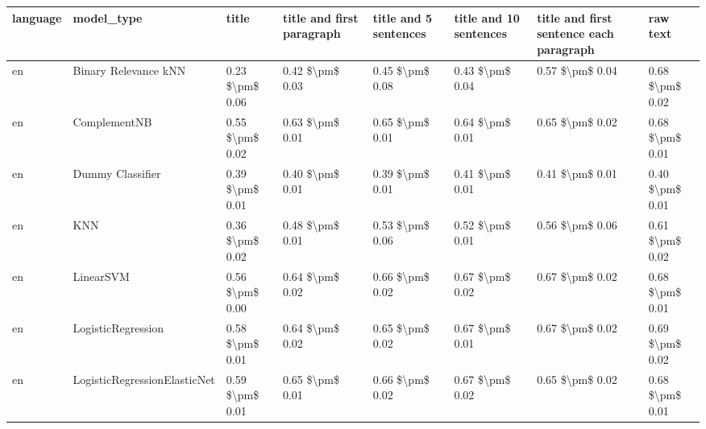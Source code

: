 \begin{tabular}{llllllll}
\toprule
language &                      model\_type &           title & title and first paragraph & title and 5 sentences & title and 10 sentences & title and first sentence each paragraph &            raw text \\
\midrule
      en &            Binary Relevance kNN & 0.23 \$\textbackslash pm\$ 0.06 &           0.42 \$\textbackslash pm\$ 0.03 &       0.45 \$\textbackslash pm\$ 0.08 &        0.43 \$\textbackslash pm\$ 0.04 &                         0.57 \$\textbackslash pm\$ 0.04 &     0.68 \$\textbackslash pm\$ 0.02 \\
      en &                    ComplementNB & 0.55 \$\textbackslash pm\$ 0.02 &           0.63 \$\textbackslash pm\$ 0.01 &       0.65 \$\textbackslash pm\$ 0.01 &        0.64 \$\textbackslash pm\$ 0.01 &                         0.65 \$\textbackslash pm\$ 0.02 &     0.68 \$\textbackslash pm\$ 0.01 \\
      en &                Dummy Classifier & 0.39 \$\textbackslash pm\$ 0.01 &           0.40 \$\textbackslash pm\$ 0.01 &       0.39 \$\textbackslash pm\$ 0.01 &        0.41 \$\textbackslash pm\$ 0.01 &                         0.41 \$\textbackslash pm\$ 0.01 &     0.40 \$\textbackslash pm\$ 0.01 \\
      en &                             KNN & 0.36 \$\textbackslash pm\$ 0.02 &           0.48 \$\textbackslash pm\$ 0.01 &       0.53 \$\textbackslash pm\$ 0.06 &        0.52 \$\textbackslash pm\$ 0.01 &                         0.56 \$\textbackslash pm\$ 0.06 &     0.61 \$\textbackslash pm\$ 0.02 \\
      en &                       LinearSVM & 0.56 \$\textbackslash pm\$ 0.00 &           0.64 \$\textbackslash pm\$ 0.02 &       0.66 \$\textbackslash pm\$ 0.02 &        0.67 \$\textbackslash pm\$ 0.02 &                         0.67 \$\textbackslash pm\$ 0.02 &     0.68 \$\textbackslash pm\$ 0.01 \\
      en &              LogisticRegression & 0.58 \$\textbackslash pm\$ 0.01 &           0.64 \$\textbackslash pm\$ 0.02 &       0.65 \$\textbackslash pm\$ 0.02 &        0.67 \$\textbackslash pm\$ 0.01 &                         0.67 \$\textbackslash pm\$ 0.02 &     0.69 \$\textbackslash pm\$ 0.02 \\
      en &    LogisticRegressionElasticNet & 0.59 \$\textbackslash pm\$ 0.01 &           0.65 \$\textbackslash pm\$ 0.01 &       0.66 \$\textbackslash pm\$ 0.02 &        0.67 \$\textbackslash pm\$ 0.02 &                         0.65 \$\textbackslash pm\$ 0.02 &     0.68 \$\textbackslash pm\$ 0.01 \\

\end{tabular}
